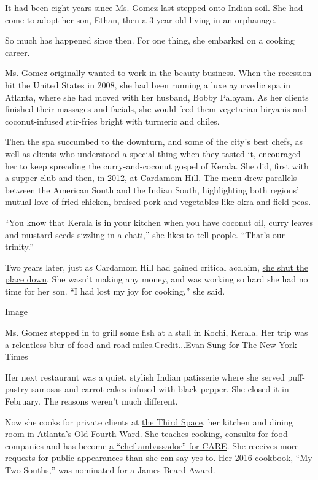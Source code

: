 It had been eight years since Ms. Gomez last stepped onto Indian soil.
She had come to adopt her son, Ethan, then a 3-year-old living in an
orphanage.

So much has happened since then. For one thing, she embarked on a
cooking career.

Ms. Gomez originally wanted to work in the beauty business. When the
recession hit the United States in 2008, she had been running a luxe
ayurvedic spa in Atlanta, where she had moved with her husband, Bobby
Palayam. As her clients finished their massages and facials, she would
feed them vegetarian biryanis and coconut-infused stir-fries bright with
turmeric and chiles.

Then the spa succumbed to the downturn, and some of the city's best
chefs, as well as clients who understood a special thing when they
tasted it, encouraged her to keep spreading the curry-and-coconut gospel
of Kerala. She did, first with a supper club and then, in 2012, at
Cardamom Hill. The menu drew parallels between the American South and
the Indian South, highlighting both regions'
\href{http://www.creativeloafing.com/food-drink/100-dishes/article/13073218/kerala-fried-chicken-and-waffles-at-cardamom-hill}{mutual
love of fried chicken}, braised pork and vegetables like okra and field
peas.

``You know that Kerala is in your kitchen when you have coconut oil,
curry leaves and mustard seeds sizzling in a chati,'' she likes to tell
people. ``That's our trinity.''

Two years later, just as Cardamom Hill had gained critical acclaim,
\href{http://www.atlantamagazine.com/dining-news/asha-gomez-on-closing-down-cardamom-hill-opening-spice-to-table-in-studioplex-friday/}{she
shut the place down}. She wasn't making any money, and was working so
hard she had no time for her son. ``I had lost my joy for cooking,'' she
said.

Image

Ms. Gomez stepped in to grill some fish at a stall in Kochi, Kerala. Her
trip was a relentless blur of food and road miles.Credit...Evan Sung for
The New York Times

Her next restaurant was a quiet, stylish Indian patisserie where she
served puff-pastry samosas and carrot cakes infused with black pepper.
She closed it in February. The reasons weren't much different.

Now she cooks for private clients at
\href{https://www.google.com/search?q=Third+Space\&oq=Third+Space\&aqs=chrome..69i57j0l5.659j0j9\&sourceid=chrome\&ie=UTF-8\#q=Third+Space+asha}{the
Third Space}, her kitchen and dining room in Atlanta's Old Fourth Ward.
She teaches cooking, consults for food companies and has become
\href{http://www.care.org/chefstable/chef-asha-gomez}{a ``chef
ambassador'' for CARE}. She receives more requests for public
appearances than she can say yes to. Her 2016 cookbook,
``\href{https://www.nytimes3xbfgragh.onion/2016/09/28/dining/asha-gomez-my-two-souths-cookbook-review.html?_r=0}{My
Two Souths},'' was nominated for a James Beard Award.

